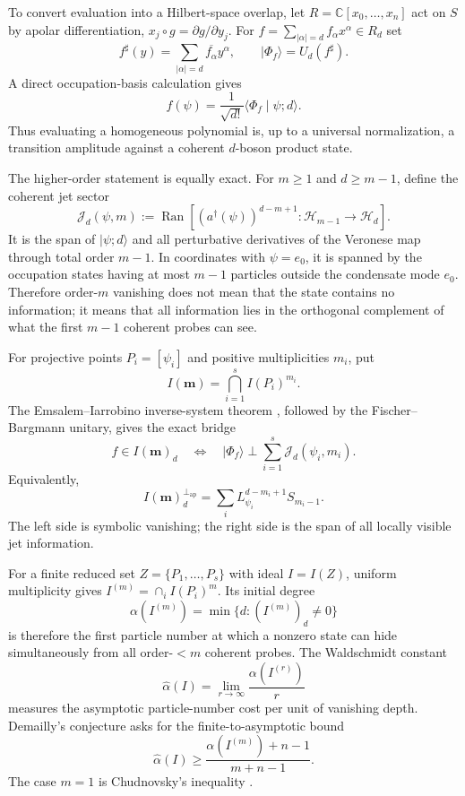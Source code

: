 \documentclass[11pt]{article}
\theoremstyle{remark}
\newcommand{\CC}{\mathbb C}
\newcommand{\whalpha}{\widehat{\alpha}}
\newcommand{\cJ}{\mathcal J}
\newcommand{\HH}{\mathcal H}
\newcommand{\Ran}{\operatorname{Ran}}
\newcommand{\ket}[1]{\lvert #1\rangle}
\newcommand{\braket}[2]{\langle #1\mid #2\rangle}
\begin{document}
To convert evaluation into a Hilbert-space overlap, let $R=\CC[x_0,\ldots,x_n]$ act on $S$ by apolar differentiation, $x_j\circ g=\partial g/\partial y_j$.  For
\(
 f=\sum_{|\alpha|=d}f_\alpha x^\alpha\in R_d
\)
set
\[
  f^\sharp(y)=\sum_{|\alpha|=d}\overline{f_\alpha}y^\alpha,
  \qquad
  \ket{\Phi_f}=U_d(f^\sharp).
\]
A direct occupation-basis calculation gives
\begin{equation}
  f(\psi)=\frac{1}{\sqrt{d!}}\braket{\Phi_f}{\psi;d}.
  \label{eq:amplitude}
\end{equation}
Thus evaluating a homogeneous polynomial is, up to a universal normalization, a transition amplitude against a coherent $d$-boson product state.

The higher-order statement is equally exact.  For $m\ge1$ and $d\ge m-1$, define the coherent jet sector
\[
  \cJ_d(\psi,m)
  :=\Ran\!\left[(a^\dagger(\psi))^{d-m+1}:\HH_{m-1}\longrightarrow\HH_d\right].
\]
It is the span of $\ket{\psi;d}$ and all perturbative derivatives of the Veronese map through total order $m-1$.  In coordinates with $\psi=e_0$, it is spanned by the occupation states having at most $m-1$ particles outside the condensate mode $e_0$.  Therefore order-$m$ vanishing does not mean that the state contains no information; it means that all information lies in the orthogonal complement of what the first $m-1$ coherent probes can see.

For projective points $P_i=[\psi_i]$ and positive multiplicities $m_i$, put
\[
  I(\mathbf m)=\bigcap_{i=1}^s I(P_i)^{m_i}.
\]
The Emsalem--Iarrobino inverse-system theorem \cite{EmsalemIarrobino1995}, followed by the Fischer--Bargmann unitary, gives the exact bridge
\begin{equation}
  f\in I(\mathbf m)_d
  \quad\Longleftrightarrow\quad
  \ket{\Phi_f}\perp\sum_{i=1}^s\cJ_d(\psi_i,m_i).
  \label{eq:bridge}
\end{equation}
Equivalently,
\[
  I(\mathbf m)_d^{\perp_{\mathrm{ap}}}
  =\sum_i L_{\psi_i}^{d-m_i+1}S_{m_i-1}.
\]
The left side is symbolic vanishing; the right side is the span of all locally visible jet information.

For a finite reduced set $Z=\{P_1,\ldots,P_s\}$ with ideal $I=I(Z)$, uniform multiplicity gives $I^{(m)}=\cap_iI(P_i)^m$.  Its initial degree
\[
  \alpha(I^{(m)})=\min\{d:(I^{(m)})_d\ne0\}
\]
is therefore the first particle number at which a nonzero state can hide simultaneously from all order-$<m$ coherent probes.  The Waldschmidt constant
\[
  \whalpha(I)=\lim_{r\to\infty}\frac{\alpha(I^{(r)})}{r}
\]
measures the asymptotic particle-number cost per unit of vanishing depth.  Demailly's conjecture asks for the finite-to-asymptotic bound
\begin{equation}
  \whalpha(I)\ge
  \frac{\alpha(I^{(m)})+n-1}{m+n-1}.
  \label{eq:demailly}
\end{equation}
The case $m=1$ is Chudnovsky's inequality \cite{Demailly1982,Chudnovsky1981}.
\end{document}
